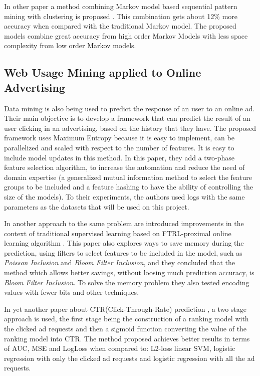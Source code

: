 In other paper a method combining Markov model based sequential pattern
mining with clustering is proposed \cite{Anitha_anew}. This combination gets
about 12\% more accuracy when compared with the traditional Markov model.
The proposed models combine great accuracy from high order Markov Models with
less space complexity from low order Markov models.

\subsection{Web Usage Mining applied to Online Advertising}

Data mining is also being used to predict the response of an user to an online
ad\cite{chapelle2013simple}. Their main objective is to develop a framework that
can predict the result of an user clicking in an advertising, based on
the history that they have.
The proposed framework uses Maximum Entropy\cite{Nigam99usingmaximum}
because it is easy to implement, can be parallelized and scaled with respect
to the number of features. It is easy to include model updates in this method.
In this paper, they add a two-phase feature selection algorithm, to increase the
automation and reduce the need of domain expertise (a generalized mutual
information method to select the feature groups to be included and a feature
hashing to have the ability of controlling the size of the models). To their
experiments, the authors used logs with the same parameters as the datasets that
will be used on this project.

In another approach to the same problem are introduced improvements in the context of traditional
supervised learning based on FTRL-proximal online learning algorithm
\cite{McMahan:2013:ACP:2487575.2488200}. This paper also explores ways
to save memory during the prediction, using filters to select features to be
included in the model, such as \emph{Poisson Inclusion} and \emph{Bloom Filter
Inclusion}, and they concluded that the method which allows better savings,
without loosing much prediction accuracy, is \emph{Bloom Filter Inclusion}. To
solve the memory problem they also tested encoding values with fewer bits and
other techniques.

In yet another paper about CTR(Click-Through-Rate) prediction
\cite{Tagami:2013:CPC:2501040.2501978}, a two stage approach is used, the first
stage being the construction of a ranking model with the clicked ad requests and then a
sigmoid function converting the value of the ranking model into CTR. The method
proposed achieves better results in terms of AUC, MSE and LogLoss when compared
to: L2-loss linear SVM, logistic regression with only the clicked ad requests and
logistic regression with all the ad requests.

